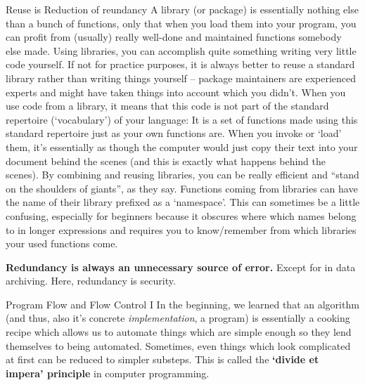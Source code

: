 \documentclass[10pt,a4paper]{article}
\begin{document}
\begin{multicols}{3}
\begin{textbox}{Reuse is Reduction of reundancy}
 A library (or package) is essentially nothing else than a bunch of functions, only that when you load them into your program, you can profit from (usually) really well-done and maintained functions somebody else made. Using libraries, you can accomplish quite something writing very little code yourself. If not for practice purposes, it is always better to reuse a standard library rather than writing things yourself -- package maintainers are experienced experts and might have taken things into account which you didn't.
When you use code from a library, it means that this code is not part of the standard repertoire (`vocabulary') of your language: It is a set of functions made using this standard repertoire just as your own functions are. When you invoke or `load' them, it's essentially as though the computer would just copy their text into your document behind the scenes (and this is exactly what happens behind the scenes). 
By combining and reusing libraries, you can be really efficient and ``stand on the shoulders of giants'', as they say.
Functions coming from libraries can have the name of their library prefixed as a `namespace'. This can sometimes be a little confusing, especially for beginners because it obscures where which names belong to in longer expressions and requires you to know/remember from which libraries your used functions come.

\textbf{Redundancy is always an unnecessary source of error.} Except for in data archiving. Here, redundancy is security.

\end{textbox}

\begin{textbox}{Program Flow and Flow Control I}
In the beginning, we learned that an algorithm (and thus, also it's concrete \emph{implementation}, a program) is essentially a cooking recipe which allows us to automate things which are simple enough so they lend themselves to being automated. Sometimes, even things which look complicated at first can be reduced to simpler substeps. This is called the \textbf{`divide et impera' principle} in computer programming. 
\end{textbox}


\end{multicols}
\end{document}
